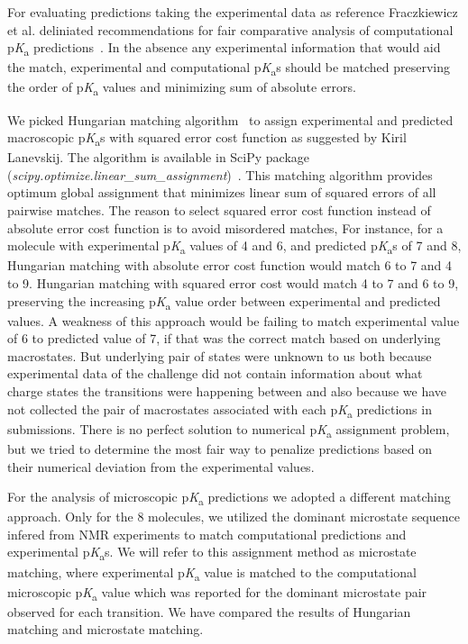 \documentclass[9pt,lineno,final]{elife}
\newcommand{\pKa}{p\textit{K}\textsubscript{a}}
\begin{document}
For evaluating predictions taking the experimental data as reference Fraczkiewicz et al. deliniated recommendations for fair comparative analysis of computational \pKa{} predictions~\citep{Fraczkiewicz:2013:ReferenceModuleinChemistryMolecularSciencesandChemicalEngineering}. 
In the absence any experimental information that would aid the match, experimental and computational \pKa{}s should be matched preserving the order of \pKa{} values and minimizing sum of absolute errors.

We picked Hungarian matching algorithm~\citep{Kuhn:1955:Nav.Res.Logist.Q., Munkres:1957:JSIAM} to assign experimental and predicted macroscopic \pKa{}s with squared error cost function  as suggested by Kiril Lanevskij. The algorithm is available in SciPy package (\textit{scipy.optimize.linear\_sum\_assignment})~\citep{SciPy-linear-sum-assignment}.
This matching algorithm provides optimum global assignment that minimizes linear sum of squared errors of all pairwise matches.
The reason to select squared error cost function instead of absolute error cost function is to avoid misordered matches,
For instance, for a molecule with experimental \pKa{} values of 4 and 6, and predicted \pKa{}s of 7 and 8, Hungarian matching with absolute error cost function would match 6 to 7 and 4 to 9.
Hungarian matching with squared error cost would match 4 to 7 and 6 to 9, preserving the increasing \pKa{} value order between experimental and predicted values.
A weakness of this approach would be failing to match experimental value of 6 to predicted value of 7, if that was the correct match based on underlying macrostates. But underlying pair of states were unknown to us both because experimental data of the challenge did not contain information about what charge states the transitions were happening between and also because we have not collected the pair of macrostates associated with each \pKa{} predictions in submissions. 
There is no perfect solution to numerical \pKa{} assignment problem, but we tried to determine the most fair way to penalize predictions based on their numerical deviation from the experimental values.

For the analysis of microscopic \pKa{} predictions we adopted a different matching approach. 
Only for the 8 molecules, we utilized the dominant microstate sequence infered from NMR experiments to match computational predictions and experimental \pKa{}s. 
We will refer to this assignment method as microstate matching, where experimental \pKa{} value is matched to the computational microscopic \pKa{} value which was reported for the dominant microstate pair observed for each transition. 
We have compared the results of Hungarian matching and microstate matching. 
\end{document}
